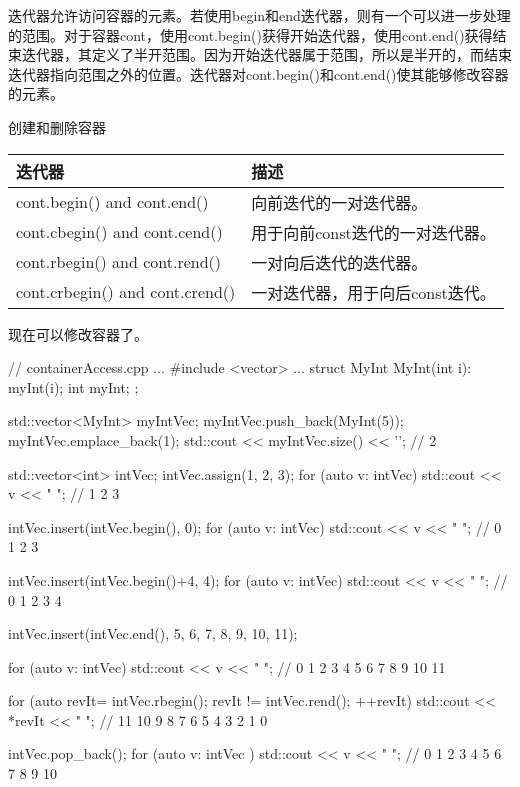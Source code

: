 迭代器允许访问容器的元素。若使用begin和end迭代器，则有一个可以进一步处理的范围。对于容器cont，使用cont.begin()获得开始迭代器，使用cont.end()获得结束迭代器，其定义了半开范围。因为开始迭代器属于范围，所以是半开的，而结束迭代器指向范围之外的位置。迭代器对cont.begin()和cont.end()使其能够修改容器的元素。

\begin{center}
创建和删除容器
\end{center}

\begin{longtable}[c]{|l|l|}
\hline
\textbf{迭代器}               & \textbf{描述}                         \\ \hline
\endfirsthead
%
\endhead
%
cont.begin() and cont.end()     & 向前迭代的一对迭代器。        \\ \hline
cont.cbegin() and cont.cend()   & 用于向前const迭代的一对迭代器。  \\ \hline
cont.rbegin() and cont.rend()   & 一对向后迭代的迭代器。       \\ \hline
cont.crbegin() and cont.crend() & 一对迭代器，用于向后const迭代。 \\ \hline
\end{longtable}

现在可以修改容器了。


\begin{cpp}
// containerAccess.cpp
...
#include <vector>
...
struct MyInt{
	MyInt(int i): myInt(i){};
	int myInt;
};

std::vector<MyInt> myIntVec;
myIntVec.push_back(MyInt(5));
myIntVec.emplace_back(1);
std::cout << myIntVec.size() << '\n'; // 2

std::vector<int> intVec;
intVec.assign({1, 2, 3});
for (auto v: intVec) std::cout << v << " "; // 1 2 3

intVec.insert(intVec.begin(), 0);
for (auto v: intVec) std::cout << v << " "; // 0 1 2 3

intVec.insert(intVec.begin()+4, 4);
for (auto v: intVec) std::cout << v << " "; // 0 1 2 3 4

intVec.insert(intVec.end(), {5, 6, 7, 8, 9, 10, 11});

for (auto v: intVec) std::cout << v << " "; // 0 1 2 3 4 5 6 7 8 9 10 11

for (auto revIt= intVec.rbegin(); revIt != intVec.rend(); ++revIt)
	std::cout << *revIt << " "; // 11 10 9 8 7 6 5 4 3 2 1 0

intVec.pop_back();
for (auto v: intVec ) std::cout << v << " "; // 0 1 2 3 4 5 6 7 8 9 10
\end{cpp}















